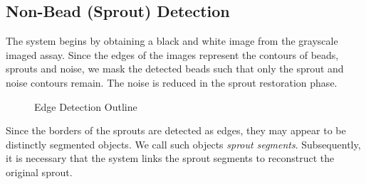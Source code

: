 \documentclass{sig-alternate}
\begin{document}
	\subsection{Non-Bead (Sprout) Detection} %
	\label{sub:Sprout Extraction}
		The system begins by obtaining a black and white image from the
		grayscale imaged assay. Since the edges of the images represent
		the contours of beads, sprouts and noise, we mask the detected
		beads such that only the sprout and noise contours remain. The noise
		is reduced in the sprout restoration phase.
		\begin{figure}[htp!]
			\centering
			\caption{Edge Detection Outline}
			\label{fig:beadex}
		\end{figure}

		Since the borders of the sprouts are detected as edges, they may
		appear to be distinctly segmented objects. We call such objects
		\emph{sprout segments}. Subsequently, it is necessary that the
		system links the sprout segments to reconstruct the original
		sprout.
\end{document}
